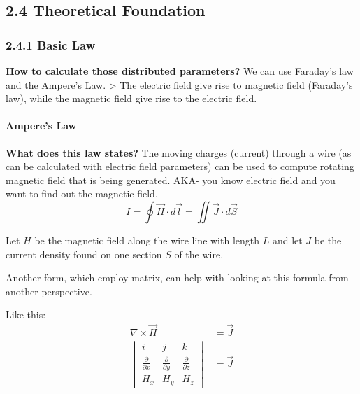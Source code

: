 \documentclass[11pt]{article}
\begin{document}
    \hypertarget{theoretical-foundation}{%
\subsection{2.4 Theoretical Foundation}\label{theoretical-foundation}}

\hypertarget{basic-law}{%
\subsubsection{2.4.1 Basic Law}\label{basic-law}}

\textbf{How to calculate those distributed parameters?} We can use
Faraday's law and the Ampere's Law. \textgreater{} The electric field
give rise to magnetic field (Faraday's law), while the magnetic field
give rise to the electric field.

\hypertarget{amperes-law}{%
\paragraph{Ampere's Law}\label{amperes-law}}

\textbf{What does this law states?} The moving charges (current) through
a wire (as can be calculated with electric field parameters) can be used
to compute rotating magnetic field that is being generated. AKA- you
know electric field and you want to find out the magnetic field.
\[I = \oint{\vec{H}}\cdot d\vec{l} = \iint \vec{J}\cdot d\vec{S}\]

Let \(H\) be the magnetic field along the wire line with length \(L\)
and let \(J\) be the current density found on one section \(S\) of the
wire.

Another form, which employ matrix, can help with looking at this formula
from another perspective.

Like this: \[
\begin{align}
  \nabla \times \vec{H}                               &= \vec{J} \\
  \begin{vmatrix}
      i & j & k \\
      \frac{\partial}{\partial x} & \frac{\partial}{\partial y} & \frac{\partial}{\partial z} \\
      H_x & H_y  & H_z 
  \end{vmatrix}                                       &= \vec{J}
\end{align}
\]
\end{document}
